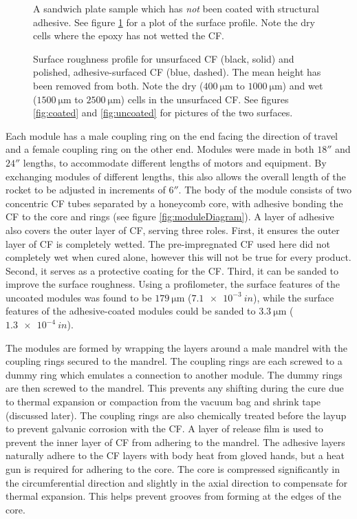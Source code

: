 \documentclass{aiaa-tc}%
\begin{document}
\begin{figure}[t]
{		\caption{A sandwich plate sample which has \emph{not} been coated with structural adhesive. See figure \ref{fig:roughness} for a plot of the surface profile. Note the dry cells where the epoxy has not wetted the CF.}
		\label{fig:uncoated}
	}
	\parbox{4in}
	{
		\centering
		
			\caption{Surface roughness profile for unsurfaced CF (black, solid) and polished, adhesive-surfaced CF (blue, dashed). The mean height has been removed from both. Note the dry ($\SI{400}{\micro\meter}$ to $\SI{1000}{\micro\meter}$) and wet ($\SI{1500}{\micro\meter}$ to $\SI{2500}{\micro\meter}$) cells in the unsurfaced CF. See figures \ref{fig:coated}  and \ref{fig:uncoated} for pictures of the two surfaces.}
		\label{fig:roughness}
	}
\end{figure}

Each module has a male coupling ring on the end facing the direction of travel and a female coupling ring on the other end. 
Modules were made in both $18''$ and $24''$ lengths, to accommodate different lengths of motors and equipment. 
By exchanging modules of different lengths, this also allows the overall length of the rocket to be adjusted in increments of $6''$.
The body of the module consists of two concentric CF tubes separated by a honeycomb core, with adhesive bonding the CF to the core and rings (see figure \ref{fig:moduleDiagram}). 
A layer of adhesive also covers the outer layer of CF, serving three roles. First, it ensures the outer layer of CF is completely wetted. 
The pre-impregnated CF used here did not completely wet when cured alone, however this will not be true for every product.
Second, it serves as a protective coating for the CF. 
Third, it can be sanded to improve the surface roughness.
Using a profilometer, the surface features of the uncoated modules was found to be $\SI{179}{\micro\meter}$ ($\SI{7.1e-3}{in}$), while the surface features of the adhesive-coated modules could be sanded to $\SI{3.3}{\micro\meter}$ ($\SI{1.3e-4}{in}$).

The modules are formed by wrapping the layers around a male mandrel with the coupling rings secured to the mandrel.
The coupling rings are each screwed to a dummy ring which emulates a connection to another module. The dummy rings are then screwed to the mandrel.
This prevents any shifting during the cure due to thermal expansion or compaction from the vacuum bag and shrink tape (discussed later).
The coupling rings are also chemically treated before the layup to prevent galvanic corrosion with the CF.
A layer of release film is used to prevent the inner layer of CF from adhering to the mandrel. 
The adhesive layers naturally adhere to the CF layers with body heat from gloved hands, but a heat gun is required for adhering to the core. 
The core is compressed significantly in the circumferential direction and slightly in the axial direction to compensate for thermal expansion. This helps prevent grooves from forming at the edges of the core.
\end{document}
